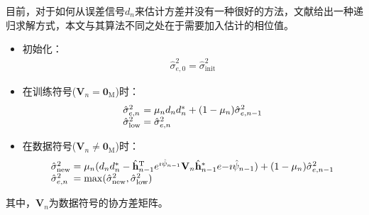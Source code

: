 目前，对于如何从误差信号$d_n$来估计方差并没有一种很好的方法，文献给出一种递归求解方式，本文与其算法不同之处在于需要加入估计的相位值。
\begin{itemize}
    \item \heiti 初始化：\begin{eqnarray}
            \hat{\sigma}_{e,0}^2=\hat{\sigma}_{\mathrm{init}}^2
            \label{equ:4.26}
        \end{eqnarray}
    \item 在训练符号($\mathbf{V}_n=\mathbf{0}_{\mathrm{M}}$)时：
        \begin{eqnarray}
            \begin{array}{l@{\;=\;}l}
                \hat{\sigma}_{e,n}^2&\mu_{n}
                d_nd_n^*+(1-\mu_{n})\hat{\sigma}_{e,n-1}^2\\
                \hat{\sigma}_{\mathrm{low}}^2&\hat{\sigma}_{e,n}^2
            \end{array}
            \label{equ:4.27}
        \end{eqnarray}
    \item 在数据符号($\mathbf{V}_n\neq
        \mathbf{0}_{\mathrm{M}}$)时：
        \begin{eqnarray}
            \begin{array}{l@{\;=\;}l}
                \hat{\sigma}_{\mathrm{new}}^2&\mu_{n}(d_nd_n^*-\hat{\mathbf{h}}^{\mathrm{T}}_{n-1}e^{\imath\hat{\psi}_{n-1}}\mathbf{V}_n\hat{\mathbf{h}}_{n-1}^*e{-\imath\hat{\psi}_{n-1}})+(1-\mu_{n})\hat{\sigma}_{e,n-1}^2\\
                \hat{\sigma}_{e,n}^2&\max(\hat{\sigma}_{\mathrm{new}}^2,\hat{\sigma}_{\mathrm{low}}^2)
            \end{array}
            \label{equ:4.28}
        \end{eqnarray}
\end{itemize}
其中，$\mathbf{V}_n$为数据符号的协方差矩阵。
